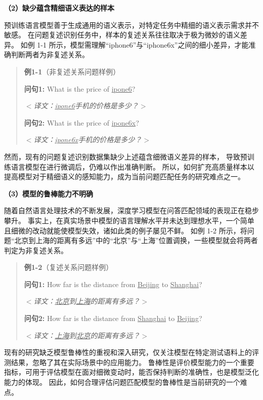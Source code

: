 \textbf{\songti （2）缺少蕴含精细语义表达的样本}

预训练语言模型善于生成通用的语义表示，对特定任务中精细的语义表示需求并不敏感。
在问题复述识别任务中，样本的复述关系往往取决于极为微妙的语义差异。
如例 1-1 所示，模型需理解{\kai“iphone6”}与{\kai“iphone6x”}之间的细小差异，才能准确判断两者为非复述关系。
\begin{quotation}
    \noindent \textbf{\songti 例1-1}（非复述关系问题样例）
    
    \noindent \textbf{问句1:} What is the price of \underline{ipone6}?
    
    \noindent $<$\textit{译文：\underline{ipone6}手机的价格是多少？}$>$
    
    \noindent \textbf{问句2:} What is the price of \underline{ipone6x}?
    
    \noindent $<$\textit{译文：\underline{ipone6x}手机的价格是多少？}$>$
    
\end{quotation}

然而，现有的问题复述识别数据集缺少上述蕴含细微语义差异的样本，
导致预训练语言模型在进行微调后，仍难以作出准确判断。
所以，如何扩充高质量样本以提高模型对于精细语义的感知能力，成为当前问题匹配任务的研究难点之一。

\textbf{\songti （3）模型的鲁棒能力不明确}

随着自然语言处理技术的不断发展，深度学习模型在问答匹配领域的表现正在稳步攀升。
事实上，在真实场景中模型的语言理解水平并未达到理想水平，一个简单且细微的改动就能使模型失效，诸如此类的例子屡见不鲜。
如例 1-2 所示，将问题{\kai“北京到上海的距离有多远”}中的{\kai“北京”}与{\kai“上海”}位置调换，一些模型就会将两者判定为非复述关系。
\begin{quotation}
    \noindent \textbf{\songti 例1-2}（复述关系问题样例）
    
    \noindent \textbf{问句1:} How far is the distance from \underline{Beijing} to \underline{Shanghai}?
    
    \noindent $<$\textit{译文：\underline{北京}到\underline{上海}的距离有多远？}$>$
    
    \noindent \textbf{问句2:} How far is the distance from \underline{Shanghai} to \underline{Beijing}?
    
    \noindent $<$\textit{译文：\underline{上海}到\underline{北京}的距离有多远？}$>$
    
\end{quotation}

现有的研究缺乏模型鲁棒性的重视和深入研究，仅关注模型在特定测试语料上的评测结果，忽略了其在实际场景中的应用能力。
鲁棒性是评价模型能力的一个重要指标，可用于评估模型在面对细微变动时，能否保持判断的准确性，也是模型泛化能力的体现。
因此，如何合理评估问题匹配模型的鲁棒性是当前研究的一个难点。


